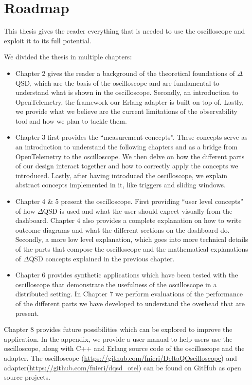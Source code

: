 \section{Roadmap}
    This thesis gives the reader everything that is needed to use the oscilloscope and exploit it to its full potential.

    We divided the thesis in multiple chapters:
    \begin{itemize}
        \item Chapter 2 gives the reader a background of the theoretical foundations of $\Delta$QSD, which are the basis of the oscilloscope and are fundamental to understand what is shown in the oscilloscope. Secondly, an introduction to OpenTelemetry, the framework our Erlang adapter is built on top of. Lastly, we provide what we believe are the current limitations of the observability tool and how we plan to tackle them.
        \item Chapter 3 first provides the ``measurement concepts''. These concepts serve as an introduction to understand the following chapters and as a bridge from OpenTelemetry to the oscilloscope.  We then delve on how the different parts of our design interact together and how to correctly apply the concepts we introduced. Lastly, after having introduced the oscilloscope, we explain abstract concepts implemented in it, like triggers and sliding windows.
        \item Chapter 4 \& 5 present the oscilloscope. First providing ``user level concepts'' of how $\Delta$QSD is used and what the user should expect visually from the dashboard. Chapter 4 also provides a complete explanation on how to write outcome diagrams and what the different sections on the dashboard do.
            Secondly, a more low level explanation, which goes into more technical details of the parts that compose the oscilloscope and the mathematical explanations of $\Delta$QSD concepts explained in the previous chapter.
        \item Chapter 6 provides synthetic applications which have been tested with the oscilloscope that demonstrate the usefulness of the oscilloscope in a distributed setting. In Chapter 7 we perform evaluations of the performance of the different parts we have developed to understand the overhead that are present.
    \end{itemize}

    Chapter 8 provides future possibilities which can be explored to improve the application. In the appendix, we provide a user manual to help users use the oscilloscope, along with C++ and Erlang source code of the oscilloscope and the adapter.
   \sloppy The oscilloscope (\url{https://github.com/fnieri/DeltaQOscilloscope}) and adapter(\url{https://github.com/fnieri/dqsd_otel}) can be found on GitHub as open source projects.
